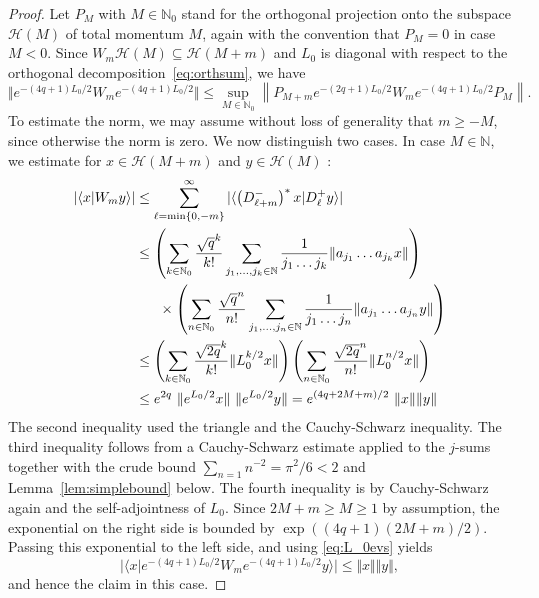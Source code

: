 \documentclass[letterpaper, DIV=17]{scrartcl}
\numberwithin{equation}{section}
\theoremstyle{definition}
\begin{document}
			\begin{proof}
					Let $ P_M $ with $ M \in \mathbb{N}_0 $ stand for the orthogonal projection onto the subspace  $ \mathcal{H}(M) $ of total momentum $ M $, again with the convention that $ P_M = 0 $ in case $ M < 0 $. 
					Since $ W_m \mathcal{H}(M)  \subseteq  \mathcal{H}(M+m) $ and $ L_0 $ is diagonal with respect to the orthogonal decomposition~\eqref{eq:orthsum}, we have
					\begin{equation}\label{eq:normestkey}
						\Vert e^{-(4q+1)L_0/2} W_m e^{-(4q+1)L_0/2} \Vert  \leq \sup_{M\in \mathbb{N}_0}  \left\| P_{M+m} e^{-(2q+1)L_0/2} W_m e^{-(4q+1)L_0/2} P_M \right\| .
					\end{equation}
					To estimate the norm, we may assume without loss of generality that $ m \geq -M $, since otherwise the norm is zero. 
					We now distinguish two cases. In case $ M \in \mathbb{N} $, we estimate for $ x \in  \mathcal{H}(M+m) $ and $ y \in  \mathcal{H}(M)$ :
					\begin{align*}
			 \vert \langle x\vert  W_m y\rangle \vert   & \leq   \sum_{\ell = \min\{0, -m\} }^\infty \vert \langle \left( D_{\ell+m}^-\right)^*   x\vert  D_\ell^+  y\rangle \vert \\
			&\leq  \left(\sum_{k\in \mathbb{N}_0} \frac{\sqrt{q}^k}{k!} \sum_{j_1, \dots, j_k\in \mathbb{N}} \frac{1}{j_1 \dots j_k} \Vert a_{j_1} \dots a_{j_k} x\Vert\right) \\
			&\mkern30mu \times \left(\sum_{n\in \mathbb{N}_0} \frac{\sqrt{q}^n}{n!} \sum_{j_1, \dots, j_n\in \mathbb{N}} \frac{1}{j_1 \dots j_n} \Vert a_{j_1} \dots a_{j_n} y\Vert\right) \\
			&\leq   \left(\sum_{k\in \mathbb{N}_0} \frac{\sqrt{2q}^k}{k!} \Vert L_0^{k/2} x \Vert \right) \left(\sum_{n\in \mathbb{N}_0} \frac{\sqrt{2q}^n}{n!}  \Vert L_0^{n/2} x \Vert \right) \\
			&\leq e^{2q} \ \Vert e^{L_0/2} x \Vert \ \Vert e^{L_0/2} y \Vert  = e^{( 4q + 2M+ m)/2}  \ \Vert x \Vert \Vert y \Vert 
		\end{align*}
		The second inequality used the triangle and the Cauchy-Schwarz inequality. The third inequality follows from a Cauchy-Schwarz estimate applied to the $ j $-sums together with the crude bound $\sum_{n=1} n^{-2}=\pi^2/6< 2$ and Lemma~\ref{lem:simplebound} below. The fourth inequality is by Cauchy-Schwarz again and the self-adjointness of $ L_0 $.
		Since $ 2M+ m \geq M \geq 1 $ by assumption, the exponential on the right side is bounded by $ \exp( (4q+1) (2M+m)/2 ) $. Passing this exponential to the left side, and using \eqref{eq:L_0evs} yields
		$$
		 \vert \langle x\vert  e^{-(4q+1)L_0/2} W_m e^{-(4q+1)L_0/2} y\rangle \vert \leq \Vert x \Vert \Vert y \Vert ,
		$$
		and hence the claim in this case. 
		

\end{proof}
\end{document}
